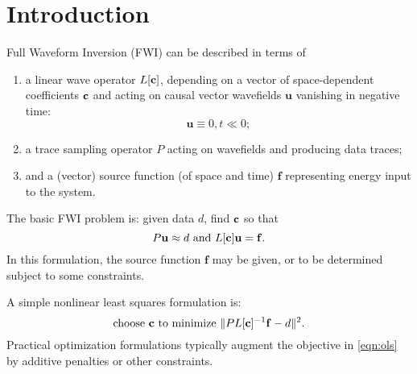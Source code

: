 \documentclass[georeport,12pt]{geophysics}
\newcommand{\bff}{\mathbf{f}}
\newcommand{\bu}{\mathbf{u}}
\begin{document}
\section{Introduction}
Full Waveform Inversion (FWI) can be described in terms of 
\begin{enumerate}
\item a linear wave operator $L[{\bf c}]$, depending on a vector of
  space-dependent coefficients ${\bf c}$ and acting on causal vector wavefields $\bu$ vanishing in negative time:
\begin{equation}
\label{eqn:init}
\bu \equiv 0, t \ll 0; 
\end{equation}
\item a trace sampling operator $P$ acting on wavefields and producing data traces;
\item and a (vector) source function (of space and time) $\bff$ representing energy input to the system. 
\end{enumerate}
The basic FWI problem is: given data $d$, find ${\bf c}$ so that 
\begin{equation}
\label{eqn:fwi}
P\bu \approx d \mbox{ and } L[\bf{c}]\bu = \bff.
\end{equation}
In this formulation, the source function $\bff$ may be given, or
to be determined subject to some constraints.

A simple nonlinear least squares formulation is:
\begin{equation}
\label{eqn:ols}
\mbox{choose } {\bf c} \mbox{ to minimize } \|PL[{\bf c}]^{-1}\bff -d \|^2.
\end{equation}
Practical optimization formulations typically augment the objective in
\ref{eqn:ols} by additive penalties or other constraints.
\end{document}
